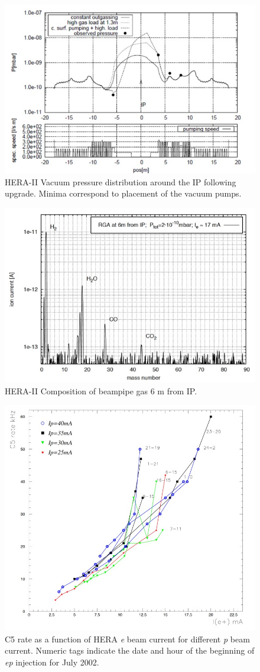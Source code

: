 \begin{figure}
	\centering
	\includegraphics[width=.75	\textwidth]{../../img/hera_badvac_regions.jpg}
	\caption{HERA-II Vacuum pressure distribution around the IP following upgrade.  Minima correspond to placement of the vacuum pumps.}
	\label{fig:hera1}
\end{figure}

\begin{figure}
	\centering
	\includegraphics[width=.75\textwidth]{../../img/hera_badvac_comp.jpg}	
	\caption {HERA-II Composition of beampipe gas 6 m from IP. }
	\label{fig:hera2}
\end{figure}

\begin{figure}
	\centering
	\includegraphics[width=.75\textwidth]{../../img/hera_c5_rate.jpg}
	\caption{C5 rate as a function of HERA \textit{e} beam current for different \textit{p} beam current.  Numeric tags indicate the date and hour of the beginning of \textit{ep} injection for July 2002.}
	\label{fig:hera3}
\end{figure}

